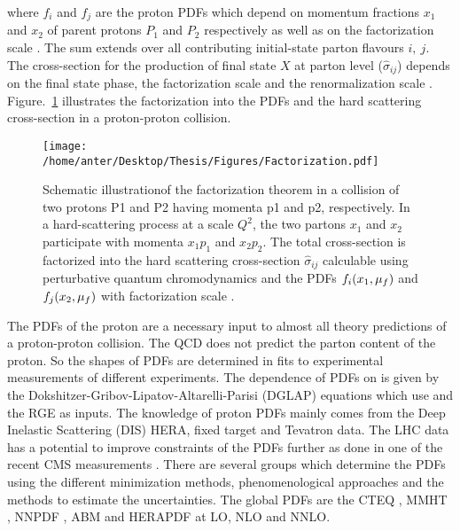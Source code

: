 where $f_i$ and $f_{j}$ are the proton PDFs which depend on momentum fractions $x_1$ and $x_2$ of parent protons $P_1$ and $P_2$ respectively as well as on the factorization scale \muf. The sum extends over all contributing initial-state parton flavours $i,~j$. The cross-section for the production of final state $X$ at parton level ($\hat\sigma_{ij}$) depends on the final state phase, the factorization scale \muf and the renormalization scale \mur. Figure.~\ref{fig:fac} illustrates the factorization into the PDFs and the hard scattering cross-section in a proton-proton collision.
\begin{figure}[!h]
\begin{center}
\hspace*{-7mm}
\texttt{[image: /home/anter/Desktop/Thesis/Figures/Factorization.pdf]}\\
\vspace*{4mm}
\caption[Schematic illustration of the factorization theorem in a collision of two protons.]{Schematic illustration\footnotemark of the factorization theorem in a collision of two protons P1 and P2 having momenta p1 and p2, respectively. In a hard-scattering process at a scale $Q^2$, the two partons $x_1$ and $x_2$ participate with momenta $x_1p_1$ and $x_2p_2$. The total cross-section is factorized into the hard scattering cross-section $\hat\sigma_{ij}$ calculable using perturbative quantum chromodynamics and the PDFs $f_i(x_1,\mu_f)$ and $f_j(x_2,\mu_f)$ with factorization scale \muf.}
\label{fig:fac}
\end{center}
\end{figure}

The PDFs of the proton are a necessary input to almost all theory predictions of a proton-proton collision. The QCD does not predict the parton content of the proton. So the shapes of PDFs are determined in fits to experimental measurements of different experiments. The dependence of PDFs on \muf is given by the Dokshitzer-Gribov-Lipatov-Altarelli-Parisi (DGLAP) \cite{Gribov:1972ri,Dokshitzer:1977sg,Altarelli:1977zs} equations which use \alps and the RGE as inputs. The knowledge of proton PDFs mainly comes from the Deep Inelastic Scattering (DIS) HERA, fixed target and Tevatron data. The LHC data has a potential to improve constraints of the PDFs further as done in one of the recent CMS measurements \cite{Sirunyan:2017skj}. There are several groups which determine the PDFs using the different minimization methods, phenomenological approaches and the methods to estimate the uncertainties. The global PDFs are the CTEQ \cite{Dulat:2015mca}, MMHT \cite{Harland-Lang:2014zoa}, NNPDF \cite{Ball:2014uwa}, ABM \cite{Alekhin:2012ig} and HERAPDF \cite{Abramowicz:2015mha} at LO, NLO and NNLO.

